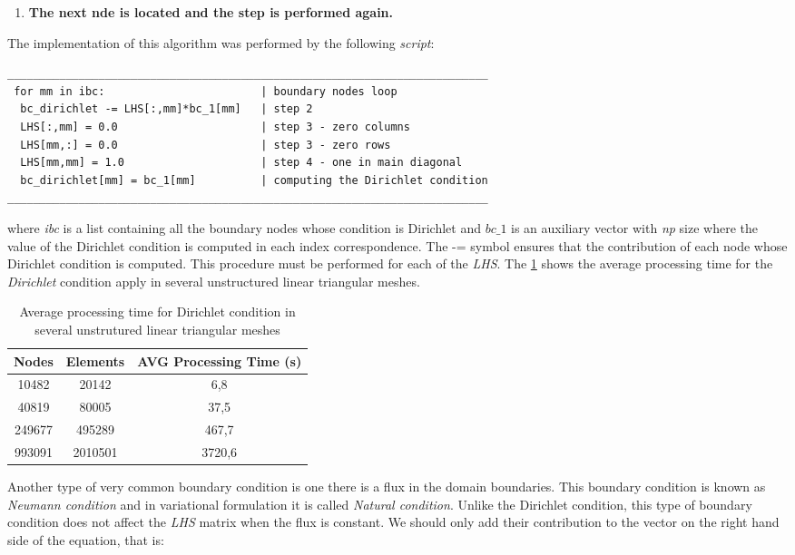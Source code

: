 \begin{enumerate}
 \vspace{0.5cm}
 \item \textbf{The next nde is located and the step is performed again.}
\end{enumerate}

\newpage
\noindent
The implementation of this algorithm was performed by the following 
\textit{script}:

\begin{verbatim}
__________________________________________________________________________
 for mm in ibc:                        | boundary nodes loop
  bc_dirichlet -= LHS[:,mm]*bc_1[mm]   | step 2
  LHS[:,mm] = 0.0                      | step 3 - zero columns
  LHS[mm,:] = 0.0                      | step 3 - zero rows
  LHS[mm,mm] = 1.0                     | step 4 - one in main diagonal
  bc_dirichlet[mm] = bc_1[mm]          | computing the Dirichlet condition
__________________________________________________________________________
\end{verbatim}

\noindent
where \textit{ibc} is a list containing all the boundary nodes 
whose condition is Dirichlet and \textit{$bc\_1$} is an auxiliary 
vector with \textit{np} size where the value of the Dirichlet 
condition is computed in each index correspondence. 
The -= symbol ensures that the contribution of each node 
whose Dirichlet condition is computed. This procedure must be 
performed for each of the \textit{LHS}. The \ref{tempo contorno} 
shows the average processing time for the \textit{Dirichlet} 
condition apply in several unstructured linear triangular meshes.

\vspace{0.5cm}
\begin{table}[H]
\centering
\begin{tabular}{ccc}
\toprule
\textbf{Nodes} & \textbf{Elements} & \textbf{AVG Processing Time} (s) \\
\midrule
10482 & 20142 & 6,8 \\
40819 & 80005 & 37,5 \\
249677 & 495289 & 467,7 \\
993091 & 2010501 & 3720,6 \\
\bottomrule
\end{tabular}
\caption{Average processing time for Dirichlet condition in several unstrutured linear triangular meshes}
\label{tempo contorno}
\end{table}
 

\medskip
Another type of very common boundary condition is one
there is a flux in the domain boundaries. This boundary condition 
is known as \textit{Neumann condition} and in variational 
formulation it is called \textit{Natural condition}. 
Unlike the Dirichlet condition, this type of boundary condition 
does not affect the \textit{LHS} matrix when the flux is constant. 
We should only add their contribution to the vector on the right hand 
side of the equation, that is:

